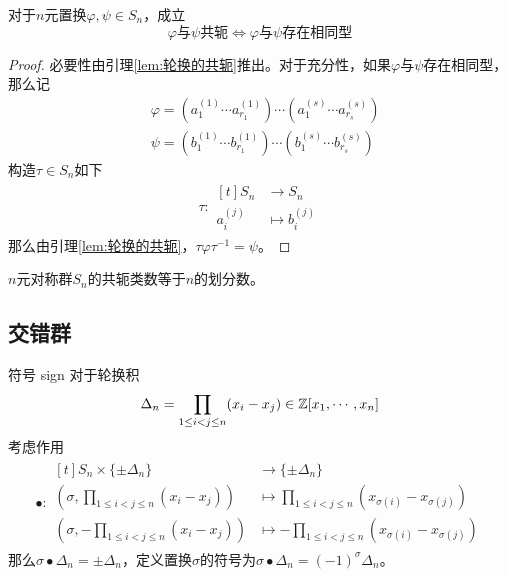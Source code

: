 \begin{proposition}
	对于$n$元置换$\varphi,\psi\in S_n$，成立
	$$
	\varphi\text{与}\psi\text{共轭}\iff 
	\varphi\text{与}\psi\text{存在相同型}
	$$
\end{proposition}

\begin{proof}
	必要性由引理\ref{lem:轮换的共轭}推出。对于充分性，如果$\varphi$与$\psi$存在相同型，那么记
	\begin{align*}
		&\varphi=(a_1^{(1)}\cdots a_{r_1}^{(1)})\cdots (a_1^{(s)}\cdots a_{r_s}^{(s)})\\
		&\psi=(b_1^{(1)}\cdots b_{r_1}^{(1)})\cdots (b_1^{(s)}\cdots b_{r_s}^{(s)})
	\end{align*}
	构造$\tau\in S_n$如下
	\begin{align*}
		\tau:\begin{aligned}[t]
			S_n&\longrightarrow S_n\\
			a_{i}^{(j)}&\longmapsto b_{i}^{(j)}
		\end{aligned}
	\end{align*}
	那么由引理\ref{lem:轮换的共轭}，$\tau\varphi\tau^{-1}=\psi$。
\end{proof}

\begin{corollary}
	$n$元对称群$S_n$的共轭类数等于$n$的划分数。
\end{corollary}

\subsection{交错群}

\begin{definition}{符号 sign}
	对于轮换积
	$$
	\Delta_n=\prod_{1\le i<j\le n}(x_i-x_j)\in \mathbb{Z}[x_1,\cdots,x_n]
	$$
	考虑作用
	\begin{align*}
		\bullet:\begin{aligned}[t]
			S_n\times \{\pm\Delta_n\}&\longrightarrow \{\pm\Delta_n\}\\
			\left(\sigma,\prod_{1\le i<j\le n}(x_i-x_j)\right)&\longmapsto\prod_{1\le i<j\le n}(x_{\sigma(i)}-x_{\sigma(j)})\\
			\left(\sigma,-\prod_{1\le i<j\le n}(x_i-x_j)\right)&\longmapsto-\prod_{1\le i<j\le n}(x_{\sigma(i)}-x_{\sigma(j)})
		\end{aligned}
	\end{align*}
	那么$\sigma\bullet \Delta_n=\pm\Delta_n$，定义置换$\sigma$的符号为$\sigma\bullet \Delta_n=(-1)^\sigma\Delta_n$。
\end{definition}

